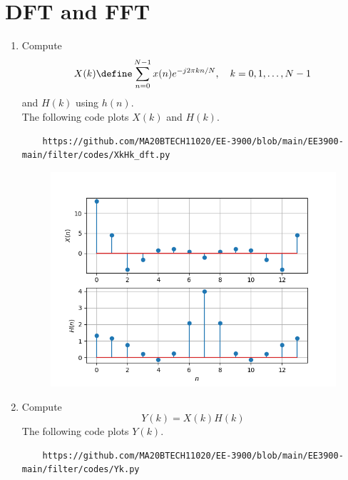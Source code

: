 \documentclass[journal,12pt,twocolumn]{IEEEtran}
\renewcommand\thesection{\arabic{section}}
\begin{document}
\section{DFT and FFT}
\begin{enumerate}[label=\thesection.\arabic*]
\item
Compute
\begin{equation}
X(k) \define \sum _{n=0}^{N-1}x(n) e^{-j2\pi kn/N}, \quad k = 0,1,\dots, N-1
\end{equation}
and $H(k)$ using $h(n)$.\\
\solution The following code plots $X(k)$ and $H(k)$.
\begin{lstlisting}
    https://github.com/MA20BTECH11020/EE-3900/blob/main/EE3900-main/filter/codes/XkHk_dft.py
\end{lstlisting}

\begin{figure}[!ht]
\centering
\includegraphics[width=\columnwidth]{./figs/Xk_Hk.png}
\caption{}
\label{fig:Hk_Xk}
\end{figure}

\item Compute 
\begin{equation}
Y(k) = X(k)H(k)
\end{equation}
\solution The following code plots $Y(k)$.
\begin{lstlisting}
    https://github.com/MA20BTECH11020/EE-3900/blob/main/EE3900-main/filter/codes/Yk.py
\end{lstlisting}


\end{enumerate}
\end{document}
